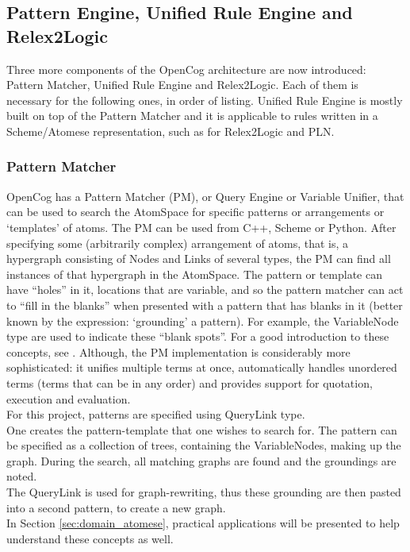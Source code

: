\subsection{Pattern Engine, Unified Rule Engine and Relex2Logic}\label{sec:pattern_ur_engine}

Three more components of the OpenCog architecture are now introduced: Pattern Matcher, Unified Rule Engine and Relex2Logic. 
Each of them is necessary for the following ones, in order of listing.
Unified Rule Engine is mostly built on top of the Pattern Matcher and it is applicable to rules written in a Scheme/Atomese representation, such as for Relex2Logic and PLN.

\subsubsection{Pattern Matcher}\label{sec:pattern_matcher}

OpenCog has a Pattern Matcher (PM), or Query Engine or Variable Unifier, that can be used to search the AtomSpace for specific patterns or arrangements or `templates' of atoms. 
The PM can be used from C++, Scheme or Python. 
After specifying some (arbitrarily complex) arrangement of atoms, that is, a hypergraph consisting of Nodes and Links of several types, the PM can find all instances of that hypergraph in the AtomSpace. The pattern or template can have \enquote{holes} in it, locations that are variable, and so the pattern matcher can act to \enquote{fill in the blanks} when presented with a pattern that has blanks in it (better known by the expression: `grounding' a pattern). 
For example, the VariableNode type are used to indicate these \enquote{blank spots}. 
For a good introduction to these concepts, see \cite{baader_nipkow_1998}. Although, the PM implementation is considerably more sophisticated: it unifies multiple terms at once, automatically handles unordered terms (terms that can be in any order) and provides support for quotation, execution and evaluation. \\

For this project, patterns are specified using QueryLink type. \\
One creates the pattern-template that one wishes to search for. The pattern can be specified as a collection of trees, containing the VariableNodes, making up the graph. 
During the search, all matching graphs are found and the groundings are noted. \\
The QueryLink is used for graph-rewriting, thus these grounding are then pasted into a second pattern, to create a new graph. \\
In Section \ref{sec:domain_atomese}, practical applications will be presented to help understand these concepts as well.


